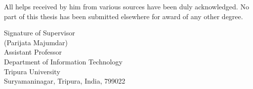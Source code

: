 \noindent All helps received by him from various sources have been duly acknowledged. No part of this thesis has been submitted elsewhere for award of any other degree.

\vspace{1.7 in}


\begin{flushright}
Signature of Supervisor\\
(Parijata Majumdar)\\
Assistant Professor\\
Department of Information Technology\\
Tripura University\\
Suryamaninagar, Tripura, India, 799022
\end{flushright}
